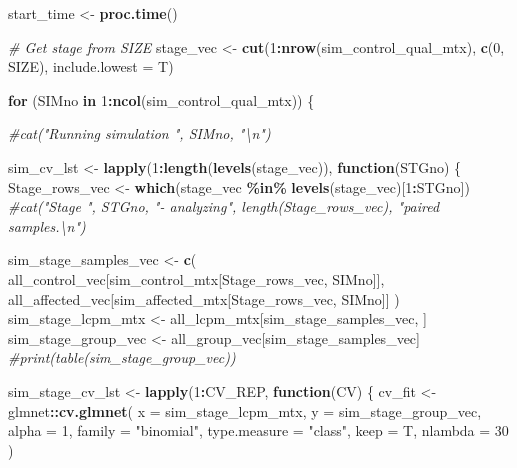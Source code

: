 \documentclass[
]{book}
\newenvironment{Shaded}{\begin{snugshade}}{\end{snugshade}}
\newcommand{\CommentTok}[1]{\textcolor[rgb]{0.56,0.35,0.01}{\textit{#1}}}
\newcommand{\ControlFlowTok}[1]{\textcolor[rgb]{0.13,0.29,0.53}{\textbf{#1}}}
\newcommand{\DataTypeTok}[1]{\textcolor[rgb]{0.13,0.29,0.53}{#1}}
\newcommand{\DecValTok}[1]{\textcolor[rgb]{0.00,0.00,0.81}{#1}}
\newcommand{\KeywordTok}[1]{\textcolor[rgb]{0.13,0.29,0.53}{\textbf{#1}}}
\newcommand{\NormalTok}[1]{#1}
\newcommand{\OperatorTok}[1]{\textcolor[rgb]{0.81,0.36,0.00}{\textbf{#1}}}
\newcommand{\StringTok}[1]{\textcolor[rgb]{0.31,0.60,0.02}{#1}}
\begin{document}
\begin{Shaded}
\begin{Highlighting}[]
\NormalTok{start\_time <{-}}\StringTok{ }\KeywordTok{proc.time}\NormalTok{()}

\CommentTok{\# Get stage from SIZE}
\NormalTok{stage\_vec <{-}}\StringTok{ }\KeywordTok{cut}\NormalTok{(}\DecValTok{1}\OperatorTok{:}\KeywordTok{nrow}\NormalTok{(sim\_control\_qual\_mtx), }\KeywordTok{c}\NormalTok{(}\DecValTok{0}\NormalTok{, SIZE), }\DataTypeTok{include.lowest =}\NormalTok{ T)}

\ControlFlowTok{for}\NormalTok{ (SIMno }\ControlFlowTok{in} \DecValTok{1}\OperatorTok{:}\KeywordTok{ncol}\NormalTok{(sim\_control\_qual\_mtx)) \{}

  \CommentTok{\#cat("Running simulation ", SIMno, "\textbackslash{}n")}

\NormalTok{  sim\_cv\_lst <{-}}\StringTok{ }\KeywordTok{lapply}\NormalTok{(}\DecValTok{1}\OperatorTok{:}\KeywordTok{length}\NormalTok{(}\KeywordTok{levels}\NormalTok{(stage\_vec)), }\ControlFlowTok{function}\NormalTok{(STGno) \{}
\NormalTok{    Stage\_rows\_vec <{-}}\StringTok{ }\KeywordTok{which}\NormalTok{(stage\_vec }\OperatorTok{\%in\%}\StringTok{ }\KeywordTok{levels}\NormalTok{(stage\_vec)[}\DecValTok{1}\OperatorTok{:}\NormalTok{STGno])}
    \CommentTok{\#cat("Stage ", STGno, "{-} analyzing", length(Stage\_rows\_vec), "paired samples.\textbackslash{}n")}

\NormalTok{    sim\_stage\_samples\_vec <{-}}\StringTok{ }\KeywordTok{c}\NormalTok{(}
\NormalTok{      all\_control\_vec[sim\_control\_mtx[Stage\_rows\_vec, SIMno]],}
\NormalTok{      all\_affected\_vec[sim\_affected\_mtx[Stage\_rows\_vec, SIMno]]}
\NormalTok{    )}
\NormalTok{    sim\_stage\_lcpm\_mtx <{-}}\StringTok{ }\NormalTok{all\_lcpm\_mtx[sim\_stage\_samples\_vec, ]}
\NormalTok{    sim\_stage\_group\_vec <{-}}\StringTok{ }\NormalTok{all\_group\_vec[sim\_stage\_samples\_vec]}
    \CommentTok{\#print(table(sim\_stage\_group\_vec))}

\NormalTok{    sim\_stage\_cv\_lst <{-}}\StringTok{ }\KeywordTok{lapply}\NormalTok{(}\DecValTok{1}\OperatorTok{:}\NormalTok{CV\_REP, }\ControlFlowTok{function}\NormalTok{(CV) \{}
\NormalTok{      cv\_fit <{-}}\StringTok{ }\NormalTok{glmnet}\OperatorTok{::}\KeywordTok{cv.glmnet}\NormalTok{(}
        \DataTypeTok{x =}\NormalTok{ sim\_stage\_lcpm\_mtx,}
        \DataTypeTok{y =}\NormalTok{ sim\_stage\_group\_vec,}
        \DataTypeTok{alpha =} \DecValTok{1}\NormalTok{,}
        \DataTypeTok{family =} \StringTok{"binomial"}\NormalTok{,}
        \DataTypeTok{type.measure =} \StringTok{"class"}\NormalTok{,}
        \DataTypeTok{keep =}\NormalTok{ T,}
        \DataTypeTok{nlambda =} \DecValTok{30}
\NormalTok{      )}


\end{Highlighting}
\end{Shaded}
\end{document}
